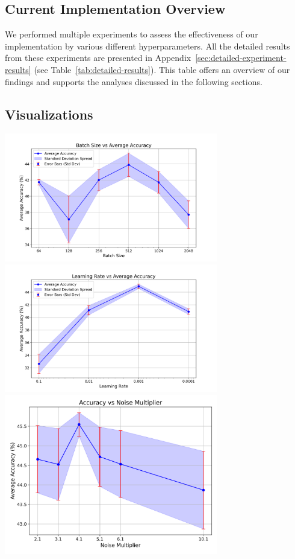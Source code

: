 \subsection{Current Implementation Overview}\label{subsec:current-implementation2}
We performed multiple experiments to assess the effectiveness of our implementation by various different hyperparameters.
All the detailed results from these experiments are presented in
Appendix~\ref{sec:detailed-experiment-results} (see Table~\ref{tab:detailed-results}).
This table offers an overview of our findings and supports the analyses discussed in the following sections.


\subsection{Visualizations}\label{subsec:best-accuracy-viz2}
\includegraphics[width=0.7\textwidth]{batch_size_vs_accuracy.png}
\includegraphics[width=0.7\textwidth]{learning_rate_vs_accuracy.png}
\includegraphics[width=0.7\textwidth]{Accuracy vs Noise Multiplier.png}

